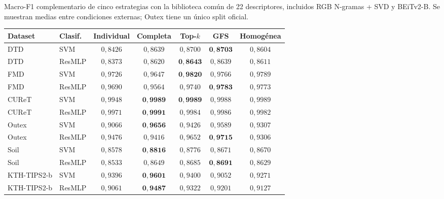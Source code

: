 \begin{resulttable}
\centering\fontsize{7.5}{9}\selectfont\setlength{\tabcolsep}{2.3pt}
\caption{Macro-F1 complementario de cinco estrategias con la biblioteca común de 22 descriptores, incluidos RGB N-gramas + SVD y BEiTv2-B. Se muestran medias entre condiciones externas; Outex tiene un único split oficial.}
\label{tab:resultados-confirmatorios}
\begin{tabular}{@{}llccccc@{}}
\toprule
Dataset & Clasif. & Individual & Completa & Top-$k$ & GFS & Homogénea \\
\midrule
DTD & SVM & $0{,}8426$ & $0{,}8639$ & $0{,}8700$ & $\mathbf{0{,}8703}$ & $0{,}8604$ \\
DTD & ResMLP & $0{,}8373$ & $0{,}8620$ & $\mathbf{0{,}8643}$ & $0{,}8639$ & $0{,}8611$ \\
FMD & SVM & $0{,}9726$ & $0{,}9647$ & $\mathbf{0{,}9820}$ & $0{,}9766$ & $0{,}9789$ \\
FMD & ResMLP & $0{,}9690$ & $0{,}9564$ & $0{,}9740$ & $\mathbf{0{,}9783}$ & $0{,}9773$ \\
CUReT & SVM & $0{,}9948$ & $\mathbf{0{,}9989}$ & $\mathbf{0{,}9989}$ & $0{,}9988$ & $0{,}9989$ \\
CUReT & ResMLP & $0{,}9971$ & $\mathbf{0{,}9991}$ & $0{,}9984$ & $0{,}9986$ & $0{,}9982$ \\
Outex & SVM & $0{,}9066$ & $\mathbf{0{,}9656}$ & $0{,}9426$ & $0{,}9589$ & $0{,}9307$ \\
Outex & ResMLP & $0{,}9476$ & $0{,}9416$ & $0{,}9652$ & $\mathbf{0{,}9715}$ & $0{,}9306$ \\
Soil & SVM & $0{,}8578$ & $\mathbf{0{,}8816}$ & $0{,}8776$ & $0{,}8671$ & $0{,}8670$ \\
Soil & ResMLP & $0{,}8533$ & $0{,}8649$ & $0{,}8685$ & $\mathbf{0{,}8691}$ & $0{,}8629$ \\
KTH-TIPS2-b & SVM & $0{,}9396$ & $\mathbf{0{,}9601}$ & $0{,}9400$ & $0{,}9052$ & $0{,}9271$ \\
KTH-TIPS2-b & ResMLP & $0{,}9061$ & $\mathbf{0{,}9487}$ & $0{,}9322$ & $0{,}9201$ & $0{,}9127$ \\
\bottomrule
\end{tabular}
\end{resulttable}
\FloatBarrier
